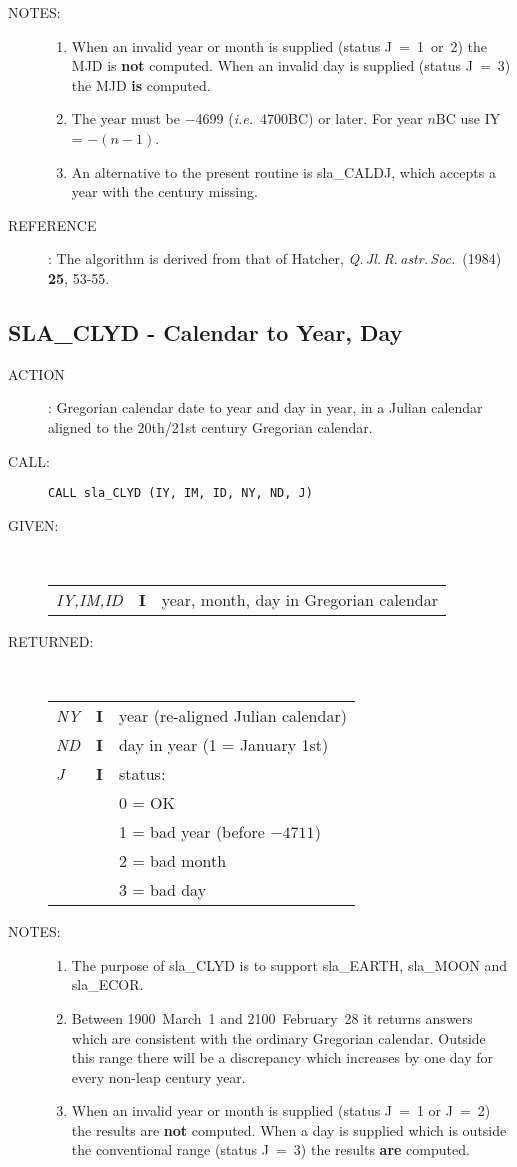 \documentclass[11pt,twoside]{article}
\newcommand{\xlabel}[1]{}
\newcommand{\routine}[3]
{\hbadness=10000
  \vbox
  {
    \rule{\textwidth}{0.3mm}\\
    {\Large {\bf #1} \hfill #2 \hfill {\bf #1}}\\
    \setlength{\oldspacing}{\topsep}
    \setlength{\topsep}{0.3ex}
    \begin{description}
      #3
    \end{description}
    \setlength{\topsep}{\oldspacing}
  }
}
\renewcommand{\routine}[3]
   {
      \subsection{#1\xlabel{#1} - #2\label{#1}}
       \begin{description}
         #3
       \end{description}
   }
\newcommand{\action}[1]
{\item[ACTION]: #1}
\newcommand{\action}[1]
   {\item[ACTION:] #1}
\newcommand{\call}[1]
{\item[CALL]: \hspace{0.4em}{\tt #1}}
\newlength{\oldspacing}
\renewcommand{\call}[1]
   {
    \item[CALL:] {\tt #1}
   }
\newcommand{\args}[2]
{
  \goodbreak
  \setlength{\oldspacing}{\topsep}
  \setlength{\topsep}{0.3ex}
  \begin{description}
  \item[#1]:\\[1.5ex]
    \begin{tabular}{p{7em}p{6em}p{22em}}
      #2
    \end{tabular}
  \end{description}
  \setlength{\topsep}{\oldspacing}
}
\renewcommand{\args}[2]
   {
     \begin{description}
        \item[#1:]\\
        \begin{tabular}{p{7em}p{6em}l}
           #2
        \end{tabular}
     \end{description}
   }
\newcommand{\spec}[3]
{
  {\em {#1}} & {\bf \mbox{#2}} & {#3}
}
\newcommand{\notes}[1]
{
  \goodbreak
  \setlength{\oldspacing}{\topsep}
  \setlength{\topsep}{0.3ex}
  \begin{description}
    \item[NOTES]:
        #1
  \end{description}
  \setlength{\topsep}{\oldspacing}
}
\renewcommand{\notes}[1]
   {
      \begin{description}
         \item[NOTES:]
            #1
      \end{description}
   }
\newcommand{\aref}[1]
{
  \goodbreak
  \setlength{\oldspacing}{\topsep}
  \setlength{\topsep}{0.3ex}
  \begin{description}
    \item[REFERENCE]:
        #1
  \end{description}
  \setlength{\topsep}{\oldspacing}
}
\newcommand{\aref}[1]
   {
     \begin{description}
       \item[REFERENCE:]
           #1
     \end{description}
   }
\begin{document}
\notes
{
 \begin{enumerate}
  \item When an invalid year or month is supplied (status J~=~1~or~2)
        the MJD is {\bf not} computed.  When an invalid day is supplied
        (status J~=~3) the MJD {\bf is} computed.
  \item The year must be $-$4699 ({\it i.e.}\ 4700BC) or later.
        For year $n$BC use IY = $-(n-1)$.
  \item An alternative to the present routine is sla\_CALDJ, which
        accepts a year with the century missing.
 \end{enumerate}
}
\aref{The algorithm is derived from that of Hatcher,
      {\it Q.\,Jl.\,R.\,astr.\,Soc.}\ (1984) {\bf 25}, 53-55.}
\routine{SLA\_CLYD}{Calendar to Year, Day}
{
 \action{Gregorian calendar date to year and day in year, in a Julian
         calendar aligned to the 20th/21st century Gregorian calendar.}
 \call{CALL sla\_CLYD (IY, IM, ID, NY, ND, J)}
}
\args{GIVEN}
{
 \spec{IY,IM,ID}{I}{year, month, day in Gregorian calendar}
}
\args{RETURNED}
{
 \spec{NY}{I}{year (re-aligned Julian calendar)} \\
 \spec{ND}{I}{day in year (1 = January 1st)} \\
 \spec{J}{I}{status:} \\
 \spec{}{}{\hspace{1.5em}  0 = OK} \\
 \spec{}{}{\hspace{1.5em}  1 = bad year (before $-4711$)} \\
 \spec{}{}{\hspace{1.5em}  2 = bad month} \\
 \spec{}{}{\hspace{1.5em}  3 = bad day}
}
\notes
{
 \begin{enumerate}
  \item The purpose of sla\_CLYD is to support sla\_EARTH,
        sla\_MOON and sla\_ECOR.
  \item Between 1900~March~1 and 2100~February~28 it returns answers
        which are consistent with the ordinary Gregorian calendar.
        Outside this range there will be a discrepancy which increases
        by one day for every non-leap century year.
  \item When an invalid year or month is supplied (status J~=~1 or J~=~2)
        the results are {\bf not} computed.  When a day is
        supplied which is outside the conventional range (status J~=~3)
        the results {\bf are} computed.
 \end{enumerate}
}
\end{document}
